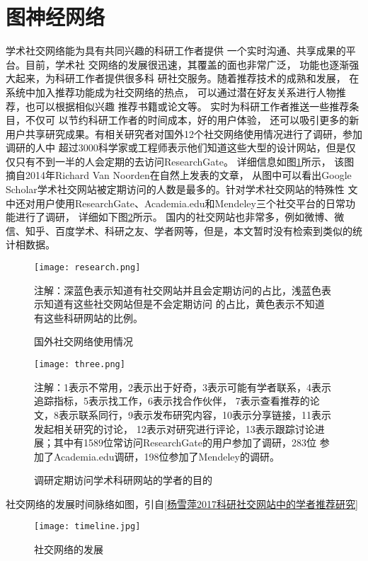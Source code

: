 \section{图神经网络}
学术社交网络能为具有共同兴趣的科研工作者提供%
一个实时沟通、共享成果的平台。目前，学术社%
交网络的发展很迅速，其覆盖的面也非常广泛，%
功能也逐渐强大起来，为科研工作者提供很多科%
研社交服务。随着推荐技术的成熟和发展，%
在系统中加入推荐功能成为社交网络的热点，%
可以通过潜在好友关系进行人物推荐，也可以根据相似兴趣%
推荐书籍或论文等。
实时为科研工作者推送一些推荐条目，不仅可%
以节约科研工作者的时间成本，好的用户体验，%
还可以吸引更多的新用户共享研究成果。有相关研究者对国外12个社交网络使用情况进行了调研，参加调研的人中%
超过3000科学家或工程师表示他们知道这些大型的设计网站，但是仅仅只有不到一半的人会定期的去访问ResearchGate。%
详细信息如图\ref{fig:research}所示，%
该图摘自2014年Richard Van Noorden在自然上发表的文章，
从图中可以看出Google Scholar学术社交网站被定期访问的人数是最多的。针对学术社交网站的特殊性%
文中还对用户使用ResearchGate、Academia.edu和Mendeley三个社交平台的日常功能进行了调研，%
详细如下图\ref{fig:three}所示。
国内的社交网站也非常多，例如微博、微信、知乎、百度学术、科研之友、学者网等，但是，本文暂时没有检索到类似的统计相数据。
\begin{figure}[htbp] %
  \centering
  \texttt{[image: research.png]}
  \caption{国外社交网络使用情况}
  \label{fig:research}
  \footnotesize
  注解：深蓝色表示知道有社交网站并且会定期访问的占比，浅蓝色表示知道有这些社交网站但是不会定期访问%
  的占比，黄色表示不知道有这些科研网站的比例。
\end{figure}
\begin{figure}[htbp] %
  \centering
  \texttt{[image: three.png]}
  \caption{调研定期访问学术科研网站的学者的目的}
  \label{fig:three}
  \footnotesize
  注解：1表示不常用，2表示出于好奇，3表示可能有学者联系，4表示追踪指标，5表示找工作，6表示找合作伙伴，%
  7表示查看推荐的论文，8表示联系同行，9表示发布研究内容，10表示分享链接，11表示发起相关研究的讨论，%
  12表示对研究进行评论，13表示跟踪讨论进展；其中有1589位常访问ResearchGate的用户参加了调研，283位%
  参加了Academia.edu调研，198位参加了Mendeley的调研。
\end{figure}

社交网络的发展时间脉络如图，引自\ref{杨雪萍2017科研社交网站中的学者推荐研究}
\begin{figure}[htbp] %
  \centering
  \texttt{[image: timeline.jpg]}
  \caption{社交网络的发展}
  \label{fig:academic_time}
\end{figure}

